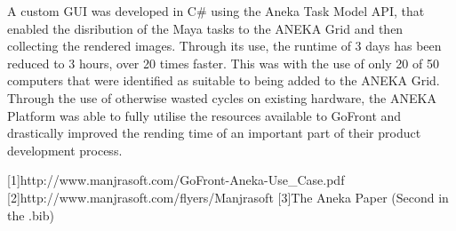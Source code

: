 A custom GUI was developed in C# using the Aneka Task Model API, that enabled the disribution of the Maya tasks to the ANEKA Grid and then collecting the rendered images. Through its use, the runtime of 3 days has been reduced to 3 hours, over 20 times faster. This was with the use of only 20 of 50 computers that were identified as suitable to being added to the ANEKA Grid. Through the use of otherwise wasted cycles on existing hardware, the ANEKA Platform was able to fully utilise the resources available to GoFront and drastically improved the rending time of an important part of their product development process. 

[1]http://www.manjrasoft.com/GoFront-Aneka-Use_Case.pdf
[2]http://www.manjrasoft.com/flyers/Manjrasoft%
[3]The Aneka Paper (Second in the .bib)
